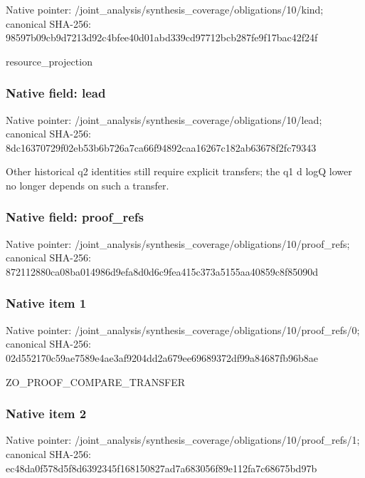 \documentclass[10pt,a4paper]{article}
\begin{document}
Native pointer: /joint\_analysis/synthesi\allowbreak{}s\_coverage/obligations/1\allowbreak{}0/kind; canonical SHA-256: 98597b09cb9d7213d92c4bfe\allowbreak{}e40d01abd339cd97712bcb28\allowbreak{}7fe9f17bac42f24f


resource\_projection


\subsubsection{Native field: lead}


Native pointer: /joint\_analysis/synthesi\allowbreak{}s\_coverage/obligations/1\allowbreak{}0/lead; canonical SHA-256: 8dc16370729f02eb53b6b726\allowbreak{}a7ca66f94892caa16267c182\allowbreak{}ab63678f2fc79343


Other historical q2 identities still require explicit transfers; the q1 d logQ lower no longer depends on such a transfer.


\subsubsection{Native field: proof\_refs}


Native pointer: /joint\_analysis/synthesi\allowbreak{}s\_coverage/obligations/1\allowbreak{}0/proof\_refs; canonical SHA-256: 872112880ca08ba014986d9e\allowbreak{}fa8d0d6c9fea415c373a5155\allowbreak{}aa40859c8f85090d



\subsubsection{Native item 1}


Native pointer: /joint\_analysis/synthesi\allowbreak{}s\_coverage/obligations/1\allowbreak{}0/proof\_refs/0; canonical SHA-256: 02d552170c59ae7589e4ae3a\allowbreak{}f9204dd2a679ee69689372df\allowbreak{}99a84687fb96b8ae


ZO\_PROOF\_COMPARE\_TRANSFER


\subsubsection{Native item 2}


Native pointer: /joint\_analysis/synthesi\allowbreak{}s\_coverage/obligations/1\allowbreak{}0/proof\_refs/1; canonical SHA-256: ec48da0f578d5f8d6392345f\allowbreak{}168150827ad7a683056f89e1\allowbreak{}12fa7c68675bd97b
\end{document}
